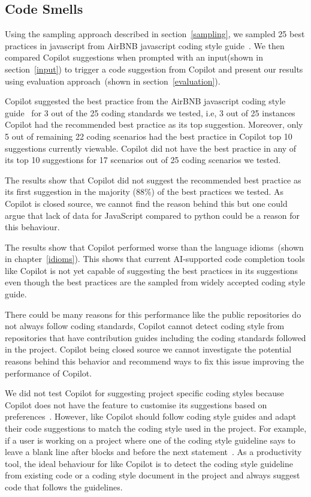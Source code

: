 \subsection{Code Smells}
\label{smells:results}
Using the sampling approach described in section~\ref{sampling}, we sampled 25 best practices in javascript from AirBNB javascript coding style guide~\cite{airbnb_code}. 
We then compared Copilot suggestions when prompted with an input(shown in section~\ref{input}) to trigger a code suggestion from Copilot and present our results using evaluation approach~(shown in section~\ref{evaluation}).

Copilot suggested the best practice from the AirBNB javascript coding style guide~\cite{airbnb_code} for 3 out of the 25 coding standards we tested, i.e, 3 out of 25 instances Copilot had the recommended best practice as its top suggestion.
Moreover, only 5 out of remaining 22 coding scenarios had the best practice in Copilot top 10 suggestions currently viewable. 
Copilot did not have the best practice in any of its top 10 suggestions for 17 scenarios out of 25 coding scenarios we tested.

The results show that Copilot did not suggest the recommended best practice as its first suggestion in the majority (88\%) of the best practices we tested.
As Copilot is closed source, we cannot find the reason behind this but one could argue that lack of data for JavaScript compared to python could be a reason for this behaviour. 

The results show that Copilot performed worse than the language idioms~(shown in chapter~\ref{idioms}).  This shows that current AI-supported
code completion tools like Copilot is not yet capable of suggesting the best practices in its suggestions even though the best practices are the sampled from widely accepted coding style guide.

There could be many reasons for this performance like the public repositories do not always follow coding standards, Copilot cannot detect coding style from repositories that have contribution guides including the coding standards followed in the project. 
Copilot being closed source we cannot investigate the potential reasons behind this behavior and recommend ways to fix this issue improving the performance of Copilot.

We did not test Copilot for suggesting project specific coding styles because Copilot does not have the feature to customise its suggestions based on preferences~\cite{Copilot-web}.
However, \cct{} like Copilot should follow coding style guides and adapt their code suggestions to match the coding style used in the project. 
For example, if a user is working on a project where one of the coding style guideline says to leave a blank line after blocks and before the next statement~\cite{airbnb_code}. As a productivity tool, the ideal behaviour for \cct{} like Copilot is to detect the coding style guideline from existing code or a coding style document in the project and always suggest code that follows the guidelines.

